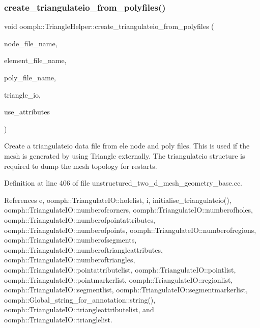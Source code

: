 \mbox{\label{namespaceoomph_1_1TriangleHelper_a5eb84bc982fe19b2f5fab0ea7a26cd78}} 
\subsubsection{\texorpdfstring{create\+\_\+triangulateio\+\_\+from\+\_\+polyfiles()}{create\_triangulateio\_from\_polyfiles()}}
{\footnotesize\ttfamily void oomph\+::\+Triangle\+Helper\+::create\+\_\+triangulateio\+\_\+from\+\_\+polyfiles (\begin{DoxyParamCaption}\item[{const std\+::string \&}]{node\+\_\+file\+\_\+name,  }\item[{const std\+::string \&}]{element\+\_\+file\+\_\+name,  }\item[{const std\+::string \&}]{poly\+\_\+file\+\_\+name,  }\item[{\hyperlink{structoomph_1_1TriangulateIO}{Triangulate\+IO} \&}]{triangle\+\_\+io,  }\item[{bool \&}]{use\+\_\+attributes }\end{DoxyParamCaption})}

Create a triangulateio data file from ele node and poly files. This is used if the mesh is generated by using Triangle externally. The triangulateio structure is required to dump the mesh topology for restarts. 

Definition at line 406 of file unstructured\+\_\+two\+\_\+d\+\_\+mesh\+\_\+geometry\+\_\+base.\+cc.



References e, oomph\+::\+Triangulate\+I\+O\+::holelist, i, initialise\+\_\+triangulateio(), oomph\+::\+Triangulate\+I\+O\+::numberofcorners, oomph\+::\+Triangulate\+I\+O\+::numberofholes, oomph\+::\+Triangulate\+I\+O\+::numberofpointattributes, oomph\+::\+Triangulate\+I\+O\+::numberofpoints, oomph\+::\+Triangulate\+I\+O\+::numberofregions, oomph\+::\+Triangulate\+I\+O\+::numberofsegments, oomph\+::\+Triangulate\+I\+O\+::numberoftriangleattributes, oomph\+::\+Triangulate\+I\+O\+::numberoftriangles, oomph\+::\+Triangulate\+I\+O\+::pointattributelist, oomph\+::\+Triangulate\+I\+O\+::pointlist, oomph\+::\+Triangulate\+I\+O\+::pointmarkerlist, oomph\+::\+Triangulate\+I\+O\+::regionlist, oomph\+::\+Triangulate\+I\+O\+::segmentlist, oomph\+::\+Triangulate\+I\+O\+::segmentmarkerlist, oomph\+::\+Global\+\_\+string\+\_\+for\+\_\+annotation\+::string(), oomph\+::\+Triangulate\+I\+O\+::triangleattributelist, and oomph\+::\+Triangulate\+I\+O\+::trianglelist.



